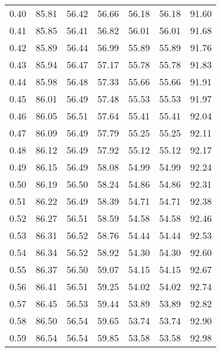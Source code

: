 \begin{tabular}{|c|c|c|c|c|c|c|}
      0.40 &     85.81 &     56.42 &      56.66 &   56.18 &      56.18 &         91.60 \\
      0.41 &     85.85 &     56.41 &      56.82 &   56.01 &      56.01 &         91.68 \\
      0.42 &     85.89 &     56.44 &      56.99 &   55.89 &      55.89 &         91.76 \\
      0.43 &     85.94 &     56.47 &      57.17 &   55.78 &      55.78 &         91.83 \\
      0.44 &     85.98 &     56.48 &      57.33 &   55.66 &      55.66 &         91.91 \\
      0.45 &     86.01 &     56.49 &      57.48 &   55.53 &      55.53 &         91.97 \\
      0.46 &     86.05 &     56.51 &      57.64 &   55.41 &      55.41 &         92.04 \\
      0.47 &     86.09 &     56.49 &      57.79 &   55.25 &      55.25 &         92.11 \\
      0.48 &     86.12 &     56.49 &      57.92 &   55.12 &      55.12 &         92.17 \\
      0.49 &     86.15 &     56.49 &      58.08 &   54.99 &      54.99 &         92.24 \\
      0.50 &     86.19 &     56.50 &      58.24 &   54.86 &      54.86 &         92.31 \\
      0.51 &     86.22 &     56.49 &      58.39 &   54.71 &      54.71 &         92.38 \\
      0.52 &     86.27 &     56.51 &      58.59 &   54.58 &      54.58 &         92.46 \\
      0.53 &     86.31 &     56.52 &      58.76 &   54.44 &      54.44 &         92.53 \\
      0.54 &     86.34 &     56.52 &      58.92 &   54.30 &      54.30 &         92.60 \\
      0.55 &     86.37 &     56.50 &      59.07 &   54.15 &      54.15 &         92.67 \\
      0.56 &     86.41 &     56.51 &      59.25 &   54.02 &      54.02 &         92.74 \\
      0.57 &     86.45 &     56.53 &      59.44 &   53.89 &      53.89 &         92.82 \\
      0.58 &     86.50 &     56.54 &      59.65 &   53.74 &      53.74 &         92.90 \\
      0.59 &     86.54 &     56.54 &      59.85 &   53.58 &      53.58 &         92.98 \\

\end{tabular}

